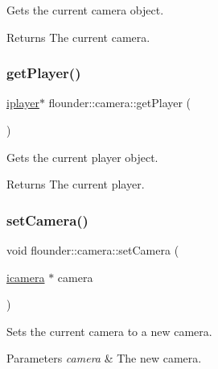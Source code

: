 Gets the current camera object. 

\begin{DoxyReturn}{Returns}
The current camera. 
\end{DoxyReturn}
\mbox{\label{classflounder_1_1camera_a662d47759c3b570def49a75981b95bc4}} 
\subsubsection{\texorpdfstring{get\+Player()}{getPlayer()}}
{\footnotesize\ttfamily \hyperlink{classflounder_1_1iplayer}{iplayer}$\ast$ flounder\+::camera\+::get\+Player (\begin{DoxyParamCaption}{ }\end{DoxyParamCaption})\hspace{0.3cm}{\ttfamily [inline]}}



Gets the current player object. 

\begin{DoxyReturn}{Returns}
The current player. 
\end{DoxyReturn}
\mbox{\label{classflounder_1_1camera_a43117513a5beffafb902448843206a79}} 
\subsubsection{\texorpdfstring{set\+Camera()}{setCamera()}}
{\footnotesize\ttfamily void flounder\+::camera\+::set\+Camera (\begin{DoxyParamCaption}\item[{\hyperlink{classflounder_1_1icamera}{icamera} $\ast$}]{camera }\end{DoxyParamCaption})\hspace{0.3cm}{\ttfamily [inline]}}



Sets the current camera to a new camera. 


\begin{DoxyParams}{Parameters}
{\em camera} & The new camera. \\
\hline
\end{DoxyParams}
\mbox{\label{classflounder_1_1camera_aa572fb3c1428b8a69aba9e9944405c5c}} 
